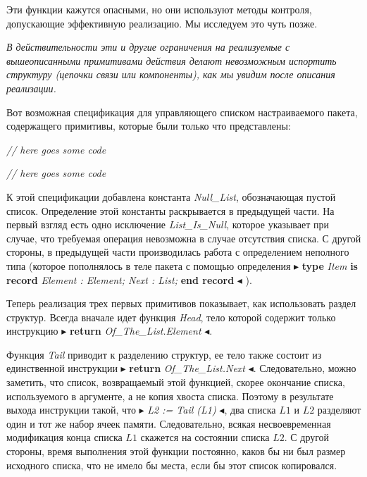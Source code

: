 \documentclass{../../template/mai_book}
\begin{document}
Эти функции кажутся опасными, но они используют методы контроля, допускающие эффективную реализацию. Мы исследуем это чуть позже.

\textit{В действительности эти и другие ограничения на реализуемые с вышеописанными примитивами действия делают невозможным испортить структуру (цепочки связи или компоненты), как мы увидим после описания реализации.}

Вот возможная спецификация для управляющего списком настраиваемого пакета, содержащего примитивы, которые были только что представлены: \newline

\textit{// here goes some code}

\newpage


\textit{// here goes some code} \newline

К этой спецификации добавлена константа \textit{Null\_List}, обозначающая пустой список. Определение этой константы раскрывается в предыдущей части. На первый взгляд есть одно исключение \textit{List\_Is\_Null}, которое указывает при случае, что требуемая операция невозможна в случае отсутствия списка. С другой стороны, в предыдущей части производилась работа с определением неполного типа (которое пополнялось в теле пакета с помощью определения $\blacktriangleright$ \textbf{type} \textit{Item} \textbf{is record} \textit{Element : Element; Next : List;} \textbf{end record} $\blacktriangleleft$ ).

Теперь реализация трех первых примитивов показывает, как использовать раздел структур. Всегда вначале идет функция \textit{Head}, тело которой содержит только инструкцию $\blacktriangleright$ \textbf{return} \textit{Of\_The\_List.Element} $\blacktriangleleft$.

Функция \textit{Tail} приводит к разделению структур, ее тело также состоит из единственной инструкции $\blacktriangleright$ \textbf{return} \textit{Of\_The\_List.Next} $\blacktriangleleft$. Следовательно, можно заметить, что список, возвращаемый этой функцией, скорее окончание списка, используемого в аргументе, а не копия хвоста списка. Поэтому в результате выхода инструкции такой, что $\blacktriangleright$ \textit{L2 := Tail (L1)} $\blacktriangleleft$, два списка $L1$ и $L2$ разделяют один и тот же набор ячеек памяти. Следовательно, всякая несвоевременная модификация конца списка $L1$ скажется на состоянии списка $L2$. С другой стороны, время выполнения этой функции постоянно, каков бы ни был размер исходного списка, что не имело бы места, если бы этот список копировался.
\end{document}

